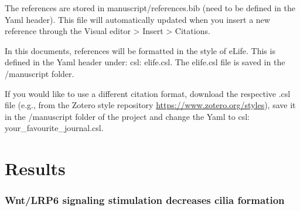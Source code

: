 \documentclass[
  11pt,
]{article}
\begin{document}
The references are stored in manuscript/references.bib (need to be
defined in the Yaml header). This file will automatically updated when
you insert a new reference through the Visual editor \textgreater{}
Insert \textgreater{} Citations.

In this documents, references will be formatted in the style of eLife.
This is defined in the Yaml header under: csl: elife.csl. The elife.csl
file is saved in the /manuscript folder.

If you would like to use a different citation format, download the
respective .csl file (e.g., from the Zotero style repository
\url{https://www.zotero.org/styles}), save it in the /manuscript folder
of the project and change the Yaml to csl: your\_favourite\_journal.csl.

\section{Results}\label{results}

\subsubsection{Wnt/LRP6 signaling stimulation decreases cilia
formation}\label{wntlrp6-signaling-stimulation-decreases-cilia-formation}
\end{document}
